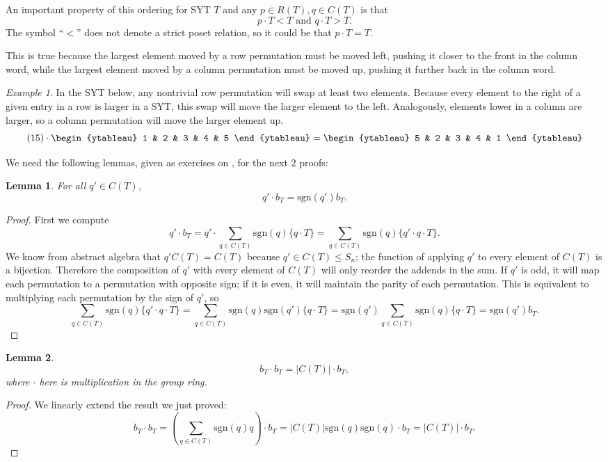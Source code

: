 \documentclass[12pt,twoside]{reedthesis}
\theoremstyle{plain}   %
\newtheorem{lemma}{Lemma}[section]
\theoremstyle{definition}
\theoremstyle{remark}
\newtheorem{ex}{Example}[section]
\numberwithin{equation}{section}
\def\sgn{\mathrm{sgn}}
\begin{document}
  An important property of this ordering for SYT $T$ and any $p \in R(T), q\in C(T)$ is that
  \[ p \cdot T < T \text{ and } q \cdot T > T.\]
  The symbol ``$<$'' does not denote a strict poset relation, so it could be that $p \cdot T = T$. \par
  This is true because the largest element moved by a row permutation must be moved left, pushing it closer to the front in the column word,
  while the largest element moved by a column permutation must be moved up, pushing it further back in the column word.
  \begin{ex}
    In the SYT below, any nontrivial row permutation will swap at least two elements.
    Because every element to the right of a given entry in a row is larger in a SYT, this swap will move the larger element to the left.
    Analogously, elements lower in a column are larger, so a column permutation will move the larger element up.
    \[
      (15) \cdot 
      \begin{ytableau}
        1 & 2 & 3 & 4 & 5 
      \end{ytableau}
      =
      \begin{ytableau}
        5 & 2 & 3 & 4 & 1 
      \end{ytableau}
    \]
  \end{ex}

  We need the following lemmas, given as exercises on \cite[Page 86]{fulton}, for the next 2 proofs:
  \begin{lemma}
    For all $q' \in C(T)$,
    \[q' \cdot b_T = \sgn(q') b_T.\]
  \end{lemma}
  \begin{proof}
    
    First we compute
    \[q' \cdot b_T = q' \cdot \sum_{q \in C(T)} \sgn(q)\{q \cdot T\} = \sum_{q \in C(T)} \sgn(q)\{q' \cdot q \cdot T\}.\]
    We know from abstract algebra that $q' C(T) = C(T)$ because $q' \in C(T) \leq S_n$; the function of applying $q'$ to every element of $C(T)$ is a
    bijection.
    Therefore the composition of $q'$ with every element of $C(T)$ will only reorder the addends in the sum.
    If $q'$ is odd, it will map each permutation to a permutation with opposite sign; if it is even, it will maintain the parity of each permutation.
    This is equivalent to multiplying  each permutation by the sign of $q'$, so
    \[\sum_{q \in C(T)} \sgn(q)\{q' \cdot q \cdot T\} = \sum_{q \in C(T)} \sgn(q)\sgn(q') \{q \cdot T\}
      = \sgn(q') \sum_{q \in C(T)} \sgn(q) \{q \cdot T\} = \sgn(q') b_T.\]
  \end{proof}
  \begin{lemma}
    \[b_T \cdot b_T = |C(T)| \cdot b_T,\] where $\cdot$ here is multiplication in the group ring.
  \end{lemma}
  \begin{proof}
    We linearly extend the result we just proved:
    \[ b_T \cdot b_T = (\sum_{q \in C(T)} \sgn(q)q) \cdot b_T = |C(T)|\sgn(q)\sgn(q) \cdot b_T = |C(T)| \cdot b_T.\]  
  \end{proof}
\end{document}
